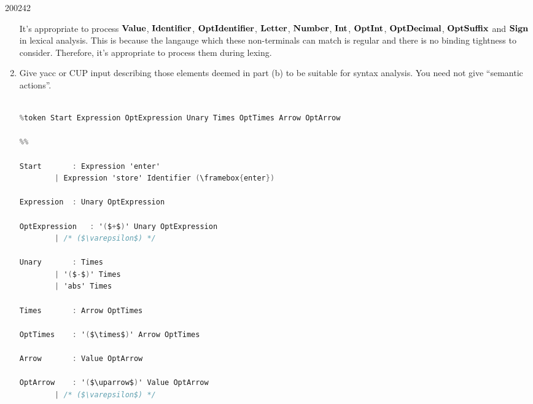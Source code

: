 \documentclass[10pt,\jkfside,a4paper]{article}
\begin{document}
\begin{examquestion}{2002}{4}{2}
\begin{enumerate}
It's appropriate to process $\mathbf{Value}$, $\mathbf{Identifier}$, $\mathbf{OptIdentifier}$,
$\mathbf{Letter}$, $\mathbf{Number}$, $\mathbf{Int}$, $\mathbf{OptInt}$, $\mathbf{OptDecimal}$, $\mathbf{OptSuffix}$ and
$\mathbf{Sign}$ in lexical analysis. This is because the langauge which these
non-terminals can match is regular and there is no binding tightness to
consider. Therefore, it's appropriate to process them during lexing.

\item Give yacc or CUP input describing those elements deemed in part (b) to
be suitable for syntax analysis. You need not give ``semantic actions''.

\begin{lstlisting}[language=C, escapeinside=()]

%token Start Expression OptExpression Unary Times OptTimes Arrow OptArrow

%%

Start 		: Expression 'enter'
		| Expression 'store' Identifier (\framebox{enter})

Expression	: Unary OptExpression

OptExpression	: '($+$)' Unary OptExpression
		| /* ($\varepsilon$) */

Unary		: Times
		| '($-$)' Times
		| 'abs' Times

Times		: Arrow OptTimes

OptTimes	: '($\times$)' Arrow OptTimes

Arrow		: Value OptArrow

OptArrow	: '($\uparrow$)' Value OptArrow
		| /* ($\varepsilon$) */
\end{lstlisting}

\end{enumerate}

\end{examquestion}
\end{document}
